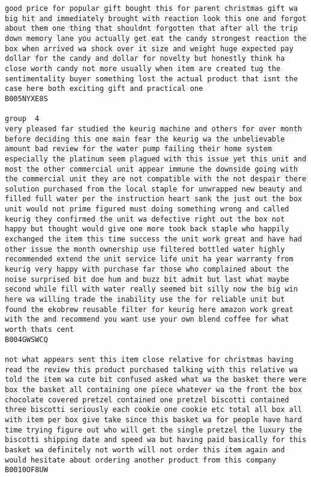 \documentclass[11pt]{article}
\begin{document}
\begin{Verbatim}[commandchars=\\\{\}]
good price for popular gift bought this for parent christmas gift wa big hit and immediately brought with reaction look this one and forgot about them one thing that shouldnt forgotten that after all the trip down memory lane you actually get eat the candy strongest reaction the box when arrived wa shock over it size and weight huge expected pay dollar for the candy and dollar for novelty but honestly think ha close worth candy not more usually when item are created tug the sentimentality buyer something lost the actual product that isnt the case here both exciting gift and practical one
B005NYXE8S

group  4
very pleased far studied the keurig machine and others for over month before deciding this one main fear the keurig wa the unbelievable amount bad review for the water pump failing their home system especially the platinum seem plagued with this issue yet this unit and most the other commercial unit appear immune the downside going with the commercial unit they are not compatible with the not despair there solution purchased from the local staple for unwrapped new beauty and filled full water per the instruction heart sank the just out the box unit would not prime figured must doing something wrong and called keurig they confirmed the unit wa defective right out the box not happy but thought would give one more took back staple who happily exchanged the item this time success the unit work great and have had other issue the month ownership use filtered bottled water highly recommended extend the unit service life unit ha year warranty from keurig very happy with purchase far those who complained about the noise surprised bit doe hum and buzz bit admit but last what maybe second while fill with water really seemed bit silly now the big win here wa willing trade the inability use the for reliable unit but found the ekobrew reusable filter for keurig here amazon work great with the and recommend you want use your own blend coffee for what worth thats cent
B004GWSWCQ

not what appears sent this item close relative for christmas having read the review this product purchased talking with this relative wa told the item wa cute bit confused asked what wa the basket there were box the basket all containing one piece whatever wa the front the box chocolate covered pretzel contained one pretzel biscotti contained three biscotti seriously each cookie one cookie etc total all box all with item per box give take since this basket wa for people have hard time trying figure out who will get the single pretzel the luxury the biscotti shipping date and speed wa but having paid basically for this basket wa definitely not worth will not order this item again and would hesitate about ordering another product from this company
B0010OF8UW


\end{Verbatim}
\end{document}
